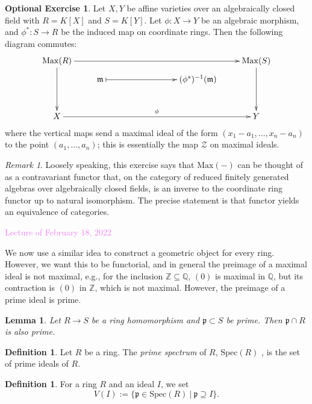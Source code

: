 \documentclass{amsart}[12pt]
\newcommand{\Feb}[1]{\textcolor{violet}{Lecture of February #1, 2022}}
\newcommand{\Q}{\mathbb{Q}}
\newcommand{\Z}{\mathbb{Z}}
\newcommand{\cZ}{\mathcal{Z}}
\newcommand{\fp}{{\mathfrak p}}
\newcommand{\fm}{{\mathfrak m}}
\newcommand{\DEF}[1]{\emph{#1}\index{#1}}
\newcommand{\Def}[1]{#1 \index{#1}}
\numberwithin{equation}{section}
\theoremstyle{plain} %
\newtheorem{lem}[equation]{Lemma}
\theoremstyle{definition}
\newtheorem{defn}[equation]{Definition}
\newtheorem{exer}[equation]{Optional Exercise}
\theoremstyle{remark}
\newtheorem{rem}[equation]{Remark}
\newcommand{\Max}{\mathrm{Max}}
\newcommand{\Spec}{\mathrm{Spec}}
\begin{document}
\begin{exer} Let $X,Y$ be affine varieties over an algebraically closed field with $R=K[X]$ and $S=K[Y]$. Let $\phi:X\to Y$ be an algebraic morphism, and $\phi^*: S\to R$ be the induced map on coordinate rings. Then the following diagram commutes:
\[ \xymatrix@R=2mm{ \Max(R) \ar[rrrrr]\ar[dddd] &&& & & \Max(S) \ar[dddd]\\
& \fm  \ar@{|->}[rrr] &&& (\phi^*)^{-1}(\fm) & \\
\\
\\
X \ar[rrrrr]^-{{\large \phi}} &&&&& Y}\]
where the vertical maps send a maximal ideal of the form $(x_1-a_1,\dots,x_n-a_n)$ to the point $(a_1,\dots,a_n)$; this is essentially the map $\cZ$ on maximal ideals.
\end{exer}

\begin{rem}
Loosely speaking, this exercise says that $\Max(-)$ can be thought of as a contravariant functor that, on the category of reduced finitely generated algebras over algebraically closed fields, is an inverse to the coordinate ring functor up to natural isomorphism. The precise statement is that functor yields an equivalence of categories.
\end{rem}

\Feb{18}


We now use a similar idea to construct a geometric object for every ring. However, we want this to be functorial, and in general the preimage of a maximal ideal is not maximal, e.g., for the inclusion $\Z\subseteq \Q$, $(0)$ is maximal in $\Q$, but its contraction is $(0)$ in $\Z$, which is not maximal. However, the preimage of a prime ideal is prime.

\begin{lem} Let $R\to S$ be a ring homomorphism and $\fp\subset S$ be prime. Then $\fp \cap R$ is also prime.
\end{lem}

\begin{defn} Let $R$ be a ring. The \DEF{prime spectrum} of $R$, \Def{$\Spec(R)$}, is the set of prime ideals of $R$. \end{defn}

\begin{defn} For a ring $R$ and an ideal $I$, we set 
\[ V(I) := \{ \fp \in \Spec(R) \ | \ \fp \supseteq I\}.\]
\end{defn}
\end{document}
